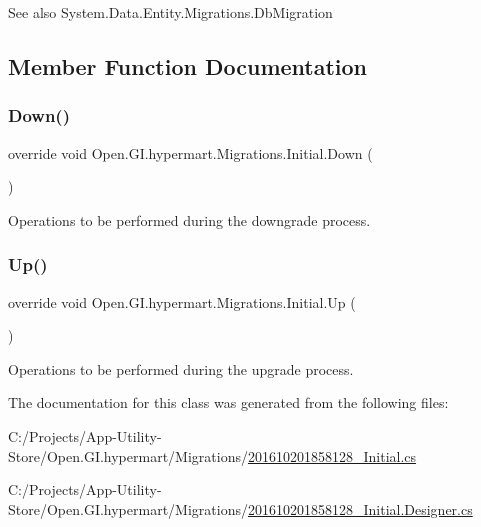 \begin{DoxySeeAlso}{See also}
System.\+Data.\+Entity.\+Migrations.\+Db\+Migration


\end{DoxySeeAlso}


\subsection{Member Function Documentation}
\hypertarget{class_open_1_1_g_i_1_1hypermart_1_1_migrations_1_1_initial_a30a9317e9693d9c0431a1bda53d4497b}{}\label{class_open_1_1_g_i_1_1hypermart_1_1_migrations_1_1_initial_a30a9317e9693d9c0431a1bda53d4497b} 
\subsubsection{\texorpdfstring{Down()}{Down()}}
{\footnotesize\ttfamily override void Open.\+G\+I.\+hypermart.\+Migrations.\+Initial.\+Down (\begin{DoxyParamCaption}{ }\end{DoxyParamCaption})}



Operations to be performed during the downgrade process. 

\hypertarget{class_open_1_1_g_i_1_1hypermart_1_1_migrations_1_1_initial_a0d322b6e395871e51474b0a1accfa014}{}\label{class_open_1_1_g_i_1_1hypermart_1_1_migrations_1_1_initial_a0d322b6e395871e51474b0a1accfa014} 
\subsubsection{\texorpdfstring{Up()}{Up()}}
{\footnotesize\ttfamily override void Open.\+G\+I.\+hypermart.\+Migrations.\+Initial.\+Up (\begin{DoxyParamCaption}{ }\end{DoxyParamCaption})}



Operations to be performed during the upgrade process. 



The documentation for this class was generated from the following files\+:\begin{DoxyCompactItemize}
\item 
C\+:/\+Projects/\+App-\/\+Utility-\/\+Store/\+Open.\+G\+I.\+hypermart/\+Migrations/\hyperlink{201610201858128___initial_8cs}{201610201858128\+\_\+\+Initial.\+cs}\item 
C\+:/\+Projects/\+App-\/\+Utility-\/\+Store/\+Open.\+G\+I.\+hypermart/\+Migrations/\hyperlink{201610201858128___initial_8_designer_8cs}{201610201858128\+\_\+\+Initial.\+Designer.\+cs}\end{DoxyCompactItemize}
